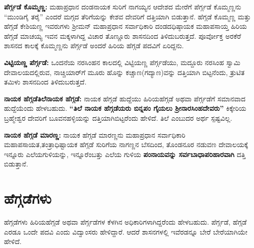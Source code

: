 \textbf{ಪೆರ್ಗ್ಗಡೆ ಕೊಮ್ಮಣ್ಣ:} ಮಹಾಪ್ರಧಾನ ದಂಡನಾಯಕ ಸುರಿಗೆ ನಾಗಯ್ಯನ ಆದೇಶದ ಮೇರೆಗೆ ಪೆರ್ಗ್ಗಡೆ ಕೊಮ್ಮಣ್ಣನು “ಮುಂಡಿಗೈ ತರೈ” ಎಂದರೆ ಮಗ್ಗದ ತೆರಿಗೆಯನ್ನು ಕೇಶವ ದೇವರಿಗೆ ದತ್ತಿಯಾಗಿ ಬಿಡುತ್ತಾನೆ. ಹೆಗ್ಗಡೆ ಕೊಮ್ಮಣ್ಣ ಮತ್ತು ಹೆಗ್ಗಡೆ ಕೇಶಿಯಣ್ಣ ಇವರುಗಳು ಶ‍್ರೀಮನ್​ ಮಹಾಪ್ರಧಾನ ಸರ್ವಾಧಿಕಾರಿ ದಂಡದಧಿಷ್ಠಾಯಕ ಮಹಾಪಸಾಯ್ತ ಹಿರಿಯ ಹೆಗ್ಗಡೆ ಮಾಚಯ್ಯ ಇವನ ಮಕ್ಕಳಾಗಿದ್ದ ವಿಚಾರ ತೊಣ್ಣೂರು ಶಾಸನದಿಂದ ತಿಳಿದುಬರುತ್ತದೆ. ಪೂರ್ವೋಕ್ತ ಅರಕೆರೆ ಶಾಸನದ ಕಾಲಕ್ಕೆ ಕೊಮ್ಮಣ್ಣನು ಪೆರ್ಗ್ಗಡೆ ಅಂದರೆ ಹಿರಿಯ ಹೆಗ್ಗಡೆ ಪದವಿಗೆ ಏರಿದ್ದನು.

\textbf{ವಿಟ್ಟಿಯಣ್ಣ ಪೆರ್ಗ್ಗಡೆ:} ಒಂದನೆಯ ನರಸಿಂಹನ ಕಾಲದಲ್ಲಿ ವಿಟ್ಟಿಯಣ್ಣ ಪೆರ್ಗ್ಗಡೆಯು, ಮದ್ದೂರು ನರಸಿಂಹ ಸ್ವಾಮಿ ದೇವಾಲಯದಲ್ಲಿರುವ, ನಾಚ್ಚಿಯಾರ್​ಗೆ ಮೂರು ಹೊನ್ನು ಕಚ್ಚಾಣ(ಗದ್ಯಾಣ)ವನ್ನು ದತ್ತಿಯಾಗಿ ಬಿಟ್ಟನೆಂದು, ತ್ರುಟಿತ ತಮಿಳು ಶಾಸನದಿಂದ ತಿಳಿದುಬರುತ್ತದೆ.

\textbf{ನಾಯಕ ಹೆಗ್ಗಡೆ\general{\enginline{-}}ತಿಲೆನಾಯಕ ಹೆಗ್ಗಡೆ:} ನಾಯಕ ಹೆಗ್ಗಡೆ ಹುದ್ದೆಯು ಹಿರಿಯಹೆಗ್ಗಡೆ ಅಥವಾ ಪೆರ್ಗ್ಗಡೆಗೆ ಸಮಾನವಾದ ಹುದ್ದೆಯೆಂದು ಹೇಳಬಹುದು. \textbf{“ತಿಲೆ ನಾಯಕ ಹೆಗ್ಗಡೆಯರು ಬಿನ್ನಪಂ ಗೈಯಲು ಶ‍್ರೀನಾರಸಿಂಹದೇವರು”} ಕಿಕ್ಕೇರಿಯ ಬ್ರಹ್ಮೇಶ್ವರ ದೇವರಿಗೆ ಬೂವನಹಳ್ಳಿಯನ್ನು ದತ್ತಿಯಾಗಿಬಿಟ್ಟರೆಂದು ಹೇಳಿದೆ. ತಿಲೆ ಎಂಬುದರ ಅರ್ಥ ಸ್ಪಷ್ಟವಿಲ್ಲ.

\textbf{ನಾಯಕ ಹೆಗ್ಗಡೆ ಮಾರಣ್ಣ:} ನಾಯಕ ಹೆಗ್ಗಡೆ ಮಾರಣ್ಣನು ಮಹಾಪ್ರಧಾನ ಸರ್ವಾಧಿಕಾರಿ ಮಹಾಪಸಾಯತ,\break ತಂತ್ರಾಧಿಷ್ಟಾಯಕ ಹೆಗ್ಗಡೆ ಸುರಿಗೆಯ ನಾಗಣ್ಣನ ಬೆಸದಿಂದ, ತೊಂಡನೂರ ನಡುವಣ ದೇವಾಲಯಕ್ಕೆ ಇನ್ನೂರು ಎಲೆಯಗುಳಿ\-ಯನ್ನು, ಇನ್ನೂರೆಂಬತ್ತು ಎಲೆಯ ಗುಳಿಯ \textbf{ಪಂನಾಯವನ್ನು ಸರ್ವಬಾಧಾಪರಿಹಾರವಾಗಿ} ದತ್ತಿ ಬಿಡುತ್ತಾನೆ.

\vskip -3pt

\section*{ಹೆಗ್ಗಡೆಗಳು}

ಹೆಗ್ಗಡೆಗಳು ಹಿರಿಯಹೆಗ್ಗಡೆ ಅಥವಾ ಪೆರ್ಗ್ಗಡೆಗಳ ಕೆಳಗಿನ ಅಧಿಕಾರಿಗಳಾಗಿದ್ದರೆಂದು ಹೇಳಬಹುದು. ಪೆರ್ಗ್ಗಡೆ, ಹೆಗ್ಗಡೆ ಎರಡೂ ಒಂದೇ ಪದವಿ ಎಂದು ವಿದ್ವಾಂಸರು ಹೇಳಿದ್ದಾರೆ. ಆದರೆ ಶಾಸನಗಳಲ್ಲಿ ಇವೆರಡನ್ನೂ ಬೇರೆ ಬೇರೆಯಾಗಿಯೇ ಹೇಳಿದೆ.

